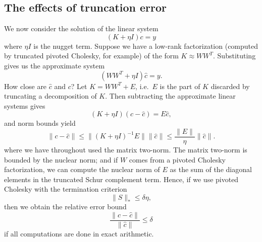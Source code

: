 \documentclass[12pt, leqno]{article} %
\begin{document}



\subsection{The effects of truncation error}

We now consider the solution of the linear system
\[
  (K + \eta I) c = y
\]
where $\eta I$ is the nugget term.  Suppose we have a low-rank
factorization (computed by truncated pivoted Cholesky, for example)
of the form $K \approx WW^T$.  Substituting gives us the approximate
system
\[
  (W W^T + \eta I) \hat{c} = y.
\]
How close are $\hat{c}$ and $c$?  Let $K = W W^T + E$, i.e.~$E$ is
the part of $K$ discarded by truncating a decomposition of $K$.
Then subtracting the approximate linear systems gives
\[
  (K+\eta I) (c-\hat{c}) = E \hat{c},
\]
and norm bounds yield
\[
  \|c-\hat{c}\| \leq
  \|(K+\eta I)^{-1} E\| \|\hat{c}\| \leq
  \frac{\|E\|}{\eta} \|\hat{c}\|.
\]
where we have throughout used the matrix two-norm.  The matrix
two-norm is bounded by the nuclear norm; and if $W$ comes from
a pivoted Cholesky factorization, we can compute the
nuclear norm of $E$ as the sum of the diagonal elements in the
truncated Schur complement term.  Hence, if we use pivoted Cholesky
with the termination criterion
\[
  \|S\|_* \leq \delta \eta,
\]
then we obtain the relative error bound
\[
  \frac{\|c-\hat{c}\|}{\|\hat{c}\|} \leq \delta
\]
if all computations are done in exact arithmetic.
\end{document}
